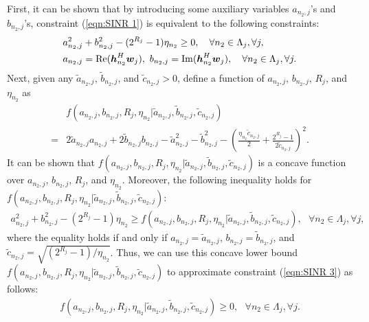 \documentclass[onecolumn, draftclsnofoot, 12pt]{IEEEtran}
\newcommand{\mv}[1]{\mbox{\boldmath{$ #1 $}}}
\begin{document}
First, it can be shown that by introducing some auxiliary variables $a_{n_2,j}$'s and $b_{n_2,j}$'s, constraint (\ref{eqn:SINR 1}) is equivalent to the following constraints:
\begin{align}
& a_{n_2,j}^2+b_{n_2,j}^2- (2^{R_j}-1)\eta_{n_2}\geq 0, ~~~ \forall n_2\in \Lambda_j, \forall j, \label{eqn:SINR 3} \\
& a_{n_2,j}={\rm Re}(\mv{h}_{n_2}^H\mv{w}_j), ~ b_{n_2,j}={\rm Im}(\mv{h}_{n_2}^H\mv{w}_j), ~~~ \forall n_2\in \Lambda_j, \forall j. \label{eqn:SINR 4}
\end{align}Next, given any $\tilde{a}_{n_2,j}$, $\tilde{b}_{n_2,j}$, and $\tilde{c}_{n_2,j}>0$, define a function of $a_{n_2,j}$, $b_{n_2,j}$, $R_j$, and $\eta_{n_2}$ as
\begin{align}
& f(a_{n_2,j},b_{n_2,j},R_j,\eta_{n_2}|\tilde{a}_{n_2,j},\tilde{b}_{n_2,j},\tilde{c}_{n_2,j}) \nonumber \\=&2\tilde{a}_{n_2,j}a_{n_2,j}+2\tilde{b}_{n_2,j}b_{n_2,j} -\tilde{a}_{n_2,j}^2-\tilde{b}_{n_2,j}^2-\left(\frac{\eta_{n_2}\tilde{c}_{n_2,j}}{2}+\frac{2^{R_j}-1}{2\tilde{c}_{n_2,j}}\right)^2. \label{eqn:function}
\end{align}It can be shown that $f(a_{n_2,j},b_{n_2,j},R_j,\eta_{n_2}|\tilde{a}_{n_2,j},\tilde{b}_{n_2,j},\tilde{c}_{n_2,j})$ is a concave function over $a_{n_2,j}$, $b_{n_2,j}$, $R_j$, and $\eta_{n_2}$. Moreover, the following inequality holds for $f(a_{n_2,j},b_{n_2,j},R_j,\eta_{n_2}|\tilde{a}_{n_2,j},\tilde{b}_{n_2,j},\tilde{c}_{n_2,j})$:
\begin{align}\label{eqn:inequality 1}
a_{n_2,j}^2+b_{n_2,j}^2-(2^{R_j}-1)\eta_{n_2}\geq f(a_{n_2,j},b_{n_2,j},R_j,\eta_{n_2}|\tilde{a}_{n_2,j},\tilde{b}_{n_2,j},\tilde{c}_{n_2,j}), ~~~ \forall n_2\in \Lambda_j, \forall j,
\end{align}where the equality holds if and only if $a_{n_2,j}=\tilde{a}_{n_2,j}$, $b_{n_2,j}=\tilde{b}_{n_2,j}$, and $\tilde{c}_{n_2,j}=\sqrt{(2^{R_j}-1)/\eta_{n_2}}$. Thus, we can use this concave lower bound $f(a_{n_2,j},b_{n_2,j},R_j,\eta_{n_2}|\tilde{a}_{n_2,j},\tilde{b}_{n_2,j},\tilde{c}_{n_2,j})$ to approximate constraint (\ref{eqn:SINR 3}) as follows:
\begin{align}\label{eqn:SINR 3 approximate}
f(a_{n_2,j},b_{n_2,j},R_j,\eta_{n_2}|\tilde{a}_{n_2,j},\tilde{b}_{n_2,j},\tilde{c}_{n_2,j})\geq 0, ~~~ \forall n_2\in \Lambda_j, \forall j.
\end{align}
\end{document}
